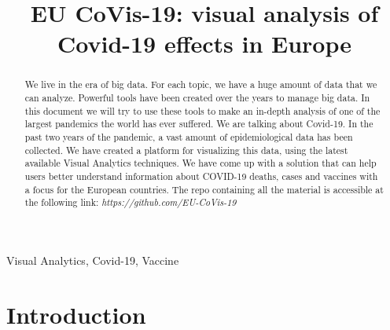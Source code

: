 \documentclass[10pt,conference]{IEEEtran}
\begin{document}
\title{EU CoVis-19: visual analysis of Covid-19 effects in Europe}


\author{
	\and
	\and
}

\maketitle

\begin{abstract}
	We live in the era of big data. For each topic, we have a huge amount of data that we can analyze. 
	Powerful tools have been created over the years to manage big data. In this document we will try to use these tools to make 
	an in-depth analysis of one of the largest pandemics the world has ever suffered. We are talking about Covid-19. In the past 
	two years of the pandemic, a vast amount of epidemiological data has been collected. We have created a platform for visualizing 
	this data, using the latest available Visual Analytics techniques. We have come up with a solution that can help users better 
	understand information about COVID-19 deaths, cases and vaccines with a focus for the European countries.
	The repo containing all the material is accessible at the following link: \emph{https://github.com/EU-CoVis-19}
\end{abstract}
\begin{IEEEkeywords}
Visual Analytics, Covid-19, Vaccine
\end{IEEEkeywords}

\section{Introduction}
\end{document}
